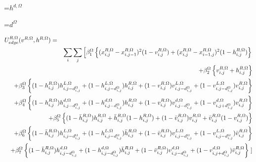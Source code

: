 {\newpage
\clearpage
\samepage \setbox\sizebox=\hbox{$h^{d,\Omega}$}\box\sizebox
}

{\newpage
\clearpage
\samepage \setbox\sizebox=\hbox{$d^{\Omega}$}\box\sizebox
}

{\newpage
\clearpage
\samepage \begin{eqnarray}\lefteqn{U^{R,\Omega}_{edge}(v^{R,\Omega},h^{R,\Omega})=} \nonumber \\ 
& & \sum_{i} \sum_{j} 
\left  [ 
 \beta_1^{\Omega}  \left \{  ( x_{i,j}^{R,\Omega} - x_{i,j-1}^{R,\Omega} )^{2} (1 - v_{i,j}^{R,\Omega} ) 
+    ( x_{i,j}^{R,\Omega} - x_{i-1,j}^{R,\Omega} )^{2} ( 1 - h_{i,j}^{R,\Omega} ) \right \}
\right . \nonumber \\ 
& & + \beta_2^{\Omega} \left \{ v_{i,j}^{R,\Omega} + h_{i,j}^{R,\Omega} \right \} \nonumber \\ 
& & +  \beta_3^{\Omega} \left  \{ (1 - h_{i,j}^{R,\Omega})h^{L,\Omega}_{i,j-d^{\Omega}_{i,j}}
+ (1 - h^{L,\Omega}_{i,j-d^{\Omega}_{i,j}}) h_{i,j}^{R,\Omega}  
+  (1 - v_{i,j}^{R,\Omega})v^{L,\Omega}_{i,j-d^{\Omega}_{i,j}}
+ (1 - v^{L,\Omega}_{i,j-d^{\Omega}_{i,j}}) v_{i,j}^{R,\Omega} \right \} \nonumber \\ 
& & +  \beta_4^{\Omega} \left  \{ (1-h_{i,j}^{R,\Omega})h_{i,j-d^{\Omega}_{i,j}}^{d,\Omega}
+ (1-h_{i,j-d^{\Omega}_{i,j}}^{d,\Omega})h_{i,j}^{R,\Omega} 
 +  (1-v_{i,j}^{R,\Omega})v_{i,j-d^{\Omega}_{i,j}}^{d,\Omega}
+ (1-v_{i,j+d^{\Omega}_{i,j}}^{d,\Omega})v_{i,j}^{R,\Omega}  \right \}  \nonumber \\ 
&& + \beta_5^{\Omega} \left \{ (1-{\bar h}_{i,j}^{R,\Omega})h_{i,j}^{R,\Omega} + {\bar h}_{i,j}^{R,\Omega} (1-h_{i,j}^{R,\Omega})
+ (1-{\bar v}_{i,j}^{R,\Omega})v_{i,j}^{R,\Omega} + {\bar v}_{i,j}^{R,\Omega} (1-v_{i,j}^{R,\Omega})
 \right \} \nonumber \\ 
& & +  \beta_6^{\Omega} \left  \{ (1 - {\bar h}_{i,j}^{R,\Omega})h^{L,\Omega}_{i,j-d^{\Omega}_{i,j}}
+ (1 - h^{L,\Omega}_{i,j-d^{\Omega}_{i,j}}){\bar  h}_{i,j}^{R,\Omega}  
+  (1 - {\bar v}_{i,j}^{R,\Omega})v^{L,\Omega}_{i,j-d^{\Omega}_{i,j}}
+ (1 - v^{L,\Omega}_{i,j-d^{\Omega}_{i,j}}) {\bar v}_{i,j}^{R,\Omega} \right \} \nonumber \\ 
& & +  \beta_7^{\Omega} \left  \{ (1-{\bar h}_{i,j}^{R,\Omega})h_{i,j-d^{\Omega}_{i,j}}^{d,\Omega}
+ (1-h_{i,j-d^{\Omega}_{i,j}}^{d,\Omega}){\bar h}_{i,j}^{R,\Omega} 
 +  (1-{\bar v}_{i,j}^{R,\Omega})v_{i,j-d^{\Omega}_{i,j}}^{d,\Omega}
+ (1-v_{i,j+d^{\Omega}_{i,j}}^{d,\Omega}){\bar v}_{i,j}^{R,\Omega}  \right \}  \left . \right ] \nonumber \\ 
& &
\label{eq:5}
\end{eqnarray}
}

